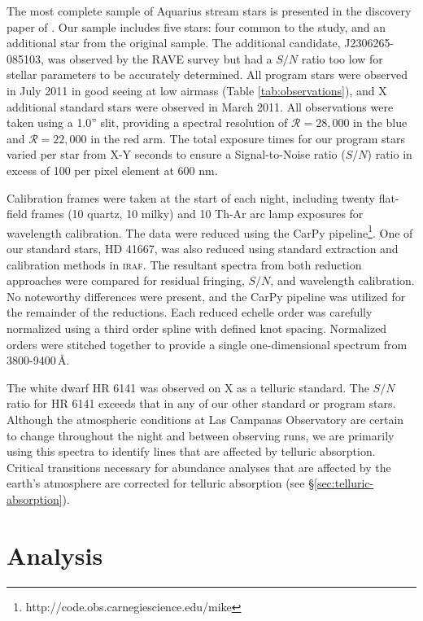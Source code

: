 \documentclass{emulateapj}
\begin{document}
The most complete sample of Aquarius stream stars is presented in the discovery paper of \citet{williams;et-al_2011}. Our sample includes five stars: four common to the \citet{wylie-de-boer;et-al_2012} study, and an additional star from the original \citet{williams;et-al_2011} sample. The additional candidate, J2306265-085103, was observed by the RAVE survey but had a $S/N$ ratio too low for stellar parameters to be accurately determined. All program stars were observed in July 2011 in good seeing at low airmass (Table \ref{tab:observations}), and X additional standard stars were observed in March 2011. All observations were taken using a 1.0'' slit, providing a spectral resolution of $\mathcal{R} = 28,000$ in the blue and $\mathcal{R} = 22,000$ in the red arm. The total exposure times for our program stars varied per star from X-Y seconds to ensure a Signal-to-Noise ratio ($S/N$) ratio in excess of 100 per pixel element at 600 nm.


Calibration frames were taken at the start of each night, including twenty flat-field frames (10 quartz, 10 milky) and 10 Th-Ar arc lamp exposures for wavelength calibration. The data were reduced using the CarPy pipeline\footnote{http://code.obs.carnegiescience.edu/mike}. One of our standard stars, HD 41667, was also reduced using standard extraction and calibration methods in \textsc{iraf}. The resultant spectra from both reduction approaches were compared for residual fringing, $S/N$, and wavelength calibration. No noteworthy differences were present, and the CarPy pipeline was utilized for the remainder of the reductions. Each reduced echelle order was carefully normalized using a third order spline with defined knot spacing. Normalized orders   were stitched together to provide a single one-dimensional spectrum from 3800-9400\,\AA{}. 
 
The white dwarf HR 6141 was observed on X as a telluric standard. The $S/N$ ratio for HR 6141 exceeds that in any of our other standard or  program stars. Although the atmospheric conditions at Las Campanas Observatory are certain to change throughout the night and between observing runs, we are primarily using this spectra to identify lines that are affected by telluric absorption. Critical transitions necessary for abundance analyses that are affected by the earth's atmosphere are corrected for telluric absorption (see \S\ref{sec:telluric-absorption}).

\section{Analysis}
\label{sec:analysis}
\end{document}
